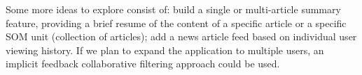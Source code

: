 \documentclass[a4paper]{article}
\begin{document}
Some more ideas to explore consist of: build a single or multi-article summary feature, providing a brief resume of the content of a specific article or a specific SOM unit (collection of articles); add a news article feed based on individual user viewing history. If we plan to expand the application to multiple users, an implicit feedback collaborative filtering \citep{hu2008} approach could be used.



\end{document}
